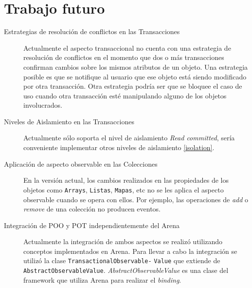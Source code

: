 \section{Trabajo futuro}
\label{Futurework}

\begin{description}

	\item[Estrategias de resolución de conflictos en las Transacciones]
		Actualmente el aspecto transaccional no cuenta con una estrategia de
		resolución de conflictos en	el momento que dos o más transacciones
		confirman cambios sobre los mismos atributos de un objeto.
		Una estrategia posible es que se notifique al usuario que ese
		objeto está siendo modificado por otra transacción.
		Otra estrategia podría ser que se bloquee el caso de uso cuando otra
		transacción esté manipulando alguno de los objetos involucrados.
		
	\item[Niveles de Aislamiento en las Transacciones]
		Actualmente sólo soporta el nivel de aislamiento \emph{Read committed}, sería
		conveniente implementar otros niveles de aislamiento \ref{isolation}.
	 
	\item[Aplicación de aspecto observable en las Colecciones]
		En la versión actual, los cambios realizados en las propiedades de los objetos
		como \lstinline|Arrays|, \lstinline|Listas|, \lstinline|Mapas|, etc no se les
		aplica el aspecto observable cuando se opera con ellos. Por ejemplo, las
		operaciones de \emph{add} o \emph{remove} de una colección no producen
		eventos.

	\item[Integración de POO y POT independientemente del Arena]
		Actualmente la integración de ambos aspectos se realizó utilizando conceptos
		implementados en Arena. Para llevar a cabo la integración se utilizó la clase
		\lstinline|TransactionalObservable|\lstinline|-| \lstinline|Value| que extiende de
		\lstinline|AbstractObservableValue|. \emph{AbstractObservableValue} es una
		clase del framework que utiliza Arena para realizar el \emph{binding}.
\end{description}